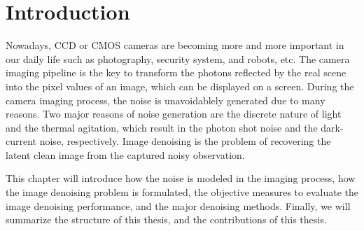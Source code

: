 %

\chapter{Introduction}
\label{sec:intro}

Nowadays, CCD or CMOS cameras are becoming more and more important in our daily life such as photography, security system, and robots, etc. The camera imaging pipeline is the key to transform the photons reflected by the real scene into the pixel values of an image, which can be displayed on a screen. During the camera imaging process, the noise is unavoidablely generated due to many reasons. Two major reasons of noise generation are the discrete nature of light and the thermal agitation, which result in the photon shot noise and the dark-current noise, respectively. Image denoising is the problem of recovering the latent clean image from the captured noisy observation. 

This chapter will introduce how the noise is modeled in the imaging process, how the image denoising problem is formulated, the objective measures to evaluate the image denoising performance, and the major denoising methods. Finally, we will summarize the structure of this thesis, and the contributions of this thesis.



